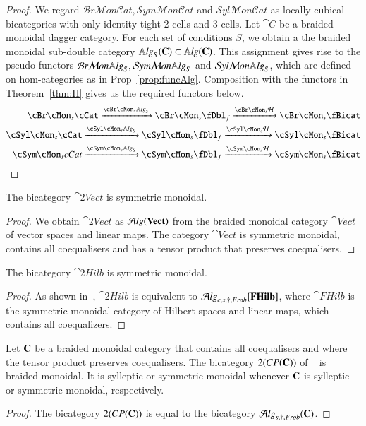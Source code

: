 \begin{proof}
We regard $\mathcal{B}r\mathcal{M}on\mathcal{C}at, 
\mathcal{S}ym\mathcal{M}on\mathcal{C}at$ and $ 
\mathcal{S}yl\mathcal{M}on\mathcal{C}at$ as locally cubical bicategories with only identity tight 2-cells and 3-cells. 
Let ${\cat C}$ be a braided monoidal dagger category. For each set of conditions $S$, we obtain a the braided monoidal sub-double category $\mathbb{A}\mathit{lg}_S({\bf C}) \subset \mathbb{A}\mathit{lg}({\bf C})$.  
This assignment gives rise to the pseudo functors $\mathcal{B}r\mathcal{M}on\mathbb{A}\mathit{lg}_S, 
\mathcal{S}ym\mathcal{M}on\mathbb{A}\mathit{lg}_S$ and $ 
\mathcal{S}yl\mathcal{M}on\mathbb{A}\mathit{lg}_S$, which are defined on hom-categories as in Prop~\ref{prop:funcAlg}. Composition with the functors in Theorem~\ref{thm:H} gives us the required functors below.
\begin{align*}
 \cBr\cMon_s\cCat\xrightarrow{\cBr\cMon_s \bAlg_S} \cBr\cMon_s\fDbl_f \xrightarrow{\cBr\cMon_s \cH} \cBr\cMon_s \fBicat \\
   \cSyl\cMon_s\cCat \xrightarrow{\cSyl\cMon_s\bAlg_S} \cSyl\cMon_s\fDbl_f \xrightarrow{\cSyl\cMon_s\cH} \cSyl\cMon_s\fBicat\\
  \cSym\cMon_scCat \xrightarrow{\cSym\cMon_s\bAlg_S} \cSym\cMon_s\fDbl_f \xrightarrow{\cSym\cMon_s \cH} \cSym\cMon_s \fBicat 
\end{align*}
\end{proof}

\begin{cor}
The bicategory $\cat{2Vect}$ is symmetric monoidal.
\end{cor}

\begin{proof}
We obtain $\cat{2Vect}$ as $\mathcal{A}\mathit{lg}(\mathbf{Vect})$ from the braided monoidal category $\cat{Vect}$ of vector spaces and linear maps. The category $\cat{Vect}$ is symmetric monoidal, contains all coequalisers and has a tensor product that preserves coequalisers. 
\end{proof}

\begin{cor}
The bicategory $\cat{2Hilb}$ is symmetric monoidal.
\end{cor}

\begin{proof}
As shown in~\cite[Section 3.6.3]{westerthesis}, $\cat{2Hilb}$ is equivalent to $\mathcal{A}\mathit{lg}_{c,s,\dagger, Frob}[\mathbf{FHilb}]$, where $\cat{FHilb}$ is the symmetric monoidal category of Hilbert spaces and linear maps, which contains all coequalizers.
\end{proof}

\begin{cor}
Let ${\bf C}$ be a braided monoidal category that contains all coequalisers and where the tensor product preserves coequalisers. The bicategory $2(CP({\bf C}))$ of ~\cite{heunenvicarywester} is braided monoidal. It is sylleptic or symmetric monoidal whenever ${\bf C}$ is sylleptic or symmetric monoidal, respectively.
\end{cor}

\begin{proof}
The bicategory $2(CP({\bf C}))$ is equal to the bicategory $\mathcal{A}\mathit{lg}_{s,\dagger, Frob}({\bf C})$.
\end{proof}

